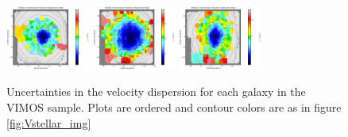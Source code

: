 \begin{figure}
      \includegraphics[width=0.245\textwidth]{Vmaps/ic1531_stellar_sigma_uncert.png}
      \includegraphics[width=0.245\textwidth]{Vmaps/ngc1399_stellar_sigma_uncert.png}
      \includegraphics[width=0.245\textwidth]{Vmaps/eso443-g024_stellar_sigma_uncert.png}
      \caption[VIMOS dispersion uncertocity maps]{Uncertainties in the velocity dispersion for each galaxy in the VIMOS sample. Plots are ordered and contour colors are as in figure \ref{fig:Vstellar_img}}
      \label{fig:Vstellar_sigma_uncert}
\end{figure}






